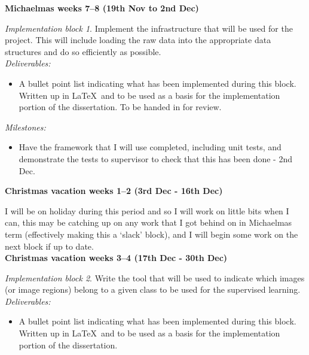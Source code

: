 {\bf Michaelmas weeks 7--8 (19th Nov to 2nd Dec)} 

{\em Implementation block 1}. Implement the infrastructure that will be used for 
the project. This will include loading the raw data into the appropriate data 
structures and do so efficiently as possible. \\

{\em Deliverables:} 
\begin{itemize} 
    \item 
    A bullet point list indicating what has been implemented during this block. 
    Written up in \LaTeX\ and to be used as a basis for the implementation 
    portion of the dissertation. To be handed in for review.
\end{itemize}

{\em Milestones:}
\begin{itemize}
    \item 
    Have the framework that I will use completed, including unit tests, and 
    demonstrate the tests to supervisor to check that this has been done - 2nd 
    Dec.
\end{itemize}




{\bf Christmas vacation weeks 1--2 (3rd Dec - 16th Dec)} 

I will be on holiday during this period and so I will work on little bits 
when I can, this may be catching up on any work that I got behind on in 
Michaelmas term (effectively making this a `slack' block), and I will begin 
some work on the next block if up to date. \\






{\bf Christmas vacation weeks 3--4 (17th Dec - 30th Dec)} 

{\em Implementation block 2}. Write the tool that will be used to indicate 
which images (or image regions) belong to a given class to be used for the 
supervised learning. \\

{\em Deliverables:} 
\begin{itemize} 
    \item 
    A bullet point list indicating what has been implemented during this block. 
    Written up in \LaTeX\ and to be used as a basis for the implementation 
    portion of the dissertation.
\end{itemize}

